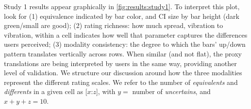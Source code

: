 Study 1 results appear graphically in \autoref{fig:results:study1}.
To interpret this plot, look for 
(1) equivalence indicated by bar color, and CI size by bar height (dark green/small are good);
(2) rating richness: how much spread, vibration to vibration, within a cell indicates how well that parameter captures the differences users perceived;
(3) modality consistency: the degree to which the bars' up/down pattern translates vertically across rows. When similar (and not flat), the proxy translations are being interpreted by users in the same way, providing another level of validation.
We structure our discussion around how the three modalities represent the different rating scales. 
We refer to the number of \textit{equivalents} and \textit{differents} in a given cell as [$x$:$z$], with $y=$ number of \textit{uncertains}, and $x+y+z=10$.

